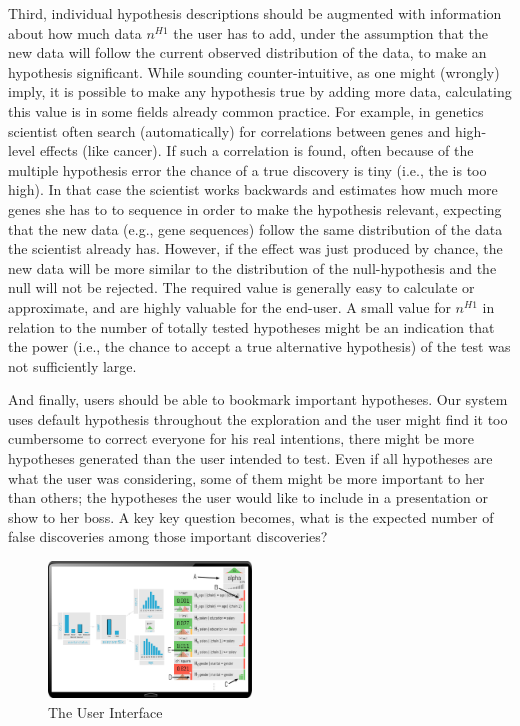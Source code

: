 Third, individual hypothesis descriptions should be augmented with information about how much data $n^{H1}$ the user has to add, under the assumption that the new data will follow the current observed distribution of the data, to make an hypothesis significant. 
While sounding counter-intuitive, as one might (wrongly) imply, it is possible to make any hypothesis true by adding more data, calculating this value is in some fields already common practice. 
For example, in genetics scientist often search (automatically) for correlations between genes and high-level effects (like cancer). 
If such a correlation is found, often because of the multiple hypothesis error the chance of a true discovery is tiny (i.e., the \pval is too high). 
In that case the scientist works backwards and estimates how much more genes she has to to sequence in order to make the hypothesis relevant, expecting that the new data (e.g., gene sequences) follow the same distribution of the data the scientist already has.
However, if the effect was just produced by chance, the new data will be more similar to the distribution of the null-hypothesis and the null will not be rejected.  
The required value is generally easy to calculate or approximate,  and are highly valuable for the end-user. 
A small value for $n^{H1}$ in relation to the number of totally tested hypotheses might be an indication that the power (i.e., the chance to accept a true alternative hypothesis) of the test was not sufficiently large. 

And finally, users should be able to bookmark important hypotheses. 
Our system uses default hypothesis throughout the exploration and the user might find it too cumbersome to correct everyone for his real intentions, there might be more hypotheses generated than the user intended to test. 
Even if all hypotheses are what the user was considering, some of them might be more important to her than others; the hypotheses the user would like to include in a presentation or show to her boss. 
A key key question becomes, what is the expected number of false discoveries among those important discoveries?

\begin{figure}
\centering
\includegraphics[width=0.48\textwidth]{figures/risk_controller}
\caption{The \system{} User Interface}
\label{fig:riskcontroller}	
\end{figure}

